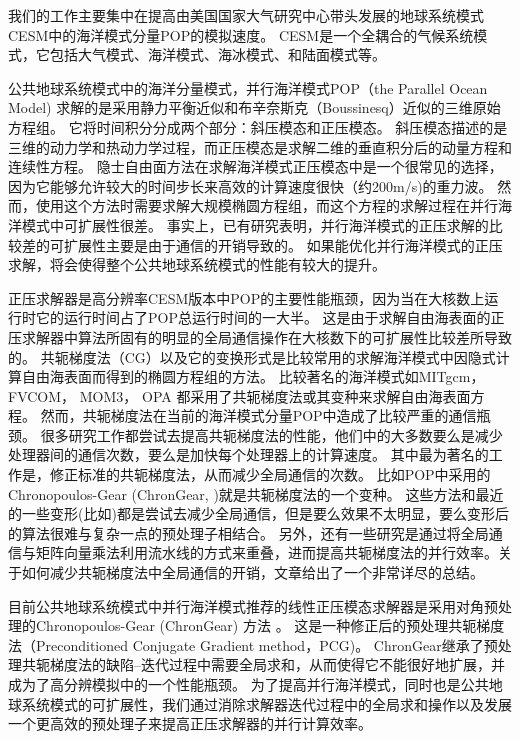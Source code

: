 我们的工作主要集中在提高由美国国家大气研究中心带头发展的地球系统模式CESM中的海洋模式分量POP的模拟速度。 CESM是一个全耦合的气候系统模式，它包括大气模式、海洋模式、海冰模式、和陆面模式等。

公共地球系统模式中的海洋分量模式，并行海洋模式POP（the Parallel Ocean Model) 求解的是采用静力平衡近似和布辛奈斯克（Boussinesq）近似的三维原始方程组。 
它将时间积分分成两个部分：斜压模态和正压模态。 
斜压模态描述的是三维的动力学和热动力学过程，而正压模态是求解二维的垂直积分后的动量方程和连续性方程。
隐士自由面方法在求解海洋模式正压模态中是一个很常见的选择，因为它能够允许较大的时间步长来高效的计算速度很快（约200m/s)的重力波。
然而，使用这个方法时需要求解大规模椭圆方程组，而这个方程的求解过程在并行海洋模式中可扩展性很差。
事实上，已有研究表明，并行海洋模式的正压求解的比较差的可扩展性主要是由于通信的开销导致的\cite{Worley:2011:PCE:2063384.2063457}。 
如果能优化并行海洋模式的正压求解，将会使得整个公共地球系统模式的性能有较大的提升\cite{dennis2012computational}。 

正压求解器是高分辨率CESM版本中POP的主要性能瓶颈，因为当在大核数上运行时它的运行时间占了POP总运行时间的一大半。 
这是由于求解自由海表面的正压求解器中算法所固有的明显的全局通信操作在大核数下的可扩展性比较差所导致的。
共轭梯度法（CG）以及它的变换形式是比较常用的求解海洋模式中因隐式计算自由海表面而得到的椭圆方程组的方法。
比较著名的海洋模式如MITgcm\citep{adcroft2014mitgcm}， FVCOM\citep{lai2010nonhydrostatic}， MOM3\citep{pacanowsky1999mom3}， OPA \citep{madec1997ocean}
都采用了共轭梯度法或其变种来求解自由海表面方程。
然而，共轭梯度法在当前的海洋模式分量POP中造成了比较严重的通信瓶颈\citep{Worley:2011:PCE:2063384.2063457}。 
很多研究工作都尝试去提高共轭梯度法的性能，他们中的大多数要么是减少处理器间的通信次数，要么是加快每个处理器上的计算速度。
其中最为著名的工作是，修正标准的共轭梯度法，从而减少全局通信的次数。 比如POP中采用的Chronopoulos-Gear (ChronGear, \cite{dAzevedo1999lapack})就是共轭梯度法的一个变种。
这些方法和最近的一些变形(比如\cite{hoemmen2010})都是尝试去减少全局通信，但是要么效果不太明显，要么变形后的算法很难与复杂一点的预处理子相结合\citep{ghysels2014}。
另外，还有一些研究是通过将全局通信与矩阵向量乘法利用流水线的方式来重叠，进而提高共轭梯度法的并行效率。关于如何减少共轭梯度法中全局通信的开销，文章\cite{ghysels2014}给出了一个非常详尽的总结。

目前公共地球系统模式中并行海洋模式推荐的线性正压模态求解器是采用对角预处理的Chronopoulos-Gear (ChronGear) 方法
\cite{dAzevedo1999lapack}。 这是一种修正后的预处理共轭梯度法（Preconditioned Conjugate
Gradient method，PCG)。 
ChronGear继承了预处理共轭梯度法的缺陷--迭代过程中需要全局求和，从而使得它不能很好地扩展，并成为了高分辨模拟中的一个性能瓶颈。
为了提高并行海洋模式，同时也是公共地球系统模式的可扩展性，我们通过消除求解器迭代过程中的全局求和操作以及发展一个更高效的预处理子来提高正压求解器的并行计算效率。


